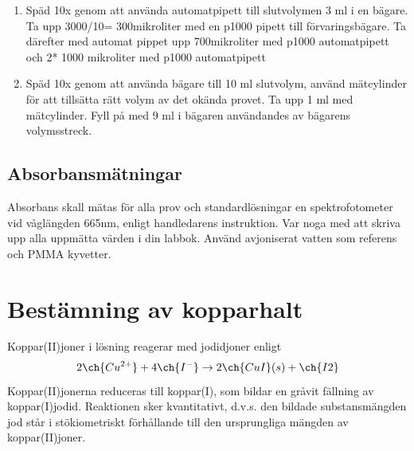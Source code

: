 \documentclass[./chem_exercises.tex]{subfiles}
\begin{document}
\begin{enumerate}
\item Späd 10x genom att använda automatpipett till slutvolymen 3 ml i en bägare.
Ta upp 3000/10= 300mikroliter med en p1000 pipett till förvaringsbägare.
Ta därefter med automat pippet upp 700mikroliter med p1000 automatpipett och
2* 1000 mikroliter med p1000 automatpipett

\item Späd 10x genom att använda bägare till 10 ml slutvolym, använd mätcylinder för att tillsätta
rätt volym av det okända provet.
Ta upp 1 ml med mätcylinder. Fyll på med 9 ml i bägaren användandes av bägarens volymsstreck.
\end{enumerate}
\subsection{Absorbansmätningar}

Absorbans skall mätas för alla prov och standardlösningar en spektrofotometer vid våglängden
665nm, enligt handledarens instruktion. Var noga med att skriva upp alla uppmätta värden i din
labbok. Använd avjoniserat vatten som referens och PMMA kyvetter.

\section{Bestämning av kopparhalt}

Koppar(II)joner i lösning reagerar med jodidjoner enligt
\begin{equation}
2\ch{Cu^{2+}} + 4\ch{I^-}\rightarrow 2\ch{CuI}(s) +\ch{I2}
\end{equation}
Koppar(II)jonerna reduceras till koppar(I), som bildar en gråvit fällning av koppar(I)jodid.
Reaktionen sker kvantitativt, d.v.s. den bildade substansmängden jod står i stökiometriskt förhållande till den
ursprungliga mängden av koppar(II)joner.\\
\end{document}
